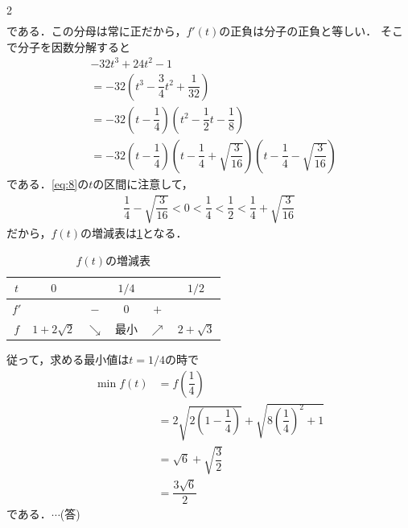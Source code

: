 \documentclass[../../main.tex]{subfiles}
\begin{document}
\begin{multicols}{2}
\begin{align}
  \end{align}
  である．この分母は常に正だから，$f'(t)$の正負は分子の正負と等しい．
  そこで分子を因数分解すると
  \begin{align}
    & -32t^3 + 24t^2-1                                                                                                            \\
    & = -32\left(t^3-\dfrac{3}{4}t^2+\dfrac{1}{32}\right)                                                                           \\
    & = -32\left(t-\dfrac{1}{4}\right)\left(t^2-\dfrac{1}{2}t-\dfrac{1}{8}\right)                                                    \\
    & = -32\left(t-\dfrac{1}{4}\right)\left(t-\dfrac{1}{4}+\sqrt{\dfrac{3}{16}}\right)\left(t-\dfrac{1}{4}-\sqrt{\dfrac{3}{16}}\right)
  \end{align}
  である．\cref{eq:8}の$t$の区間に注意して，
  \begin{align}
    \dfrac{1}{4}-\sqrt{\dfrac{3}{16}} < 0 < \dfrac{1}{4} < \dfrac{1}{2} < \dfrac{1}{4}+\sqrt{\dfrac{3}{16}}
  \end{align}
  だから，$f(t)$の増減表は\cref{2002-2:table:1}となる．

  \begin{table}[H]
    \centering
    \caption{$f(t)$の増減表}
    \label{2002-2:table:1}
    \begin{tabular}{|c||c|c|c|c|c|}
      \hline
      $t$  & $0$           &            & $1/4$ &            & $1/2$        \\
      \hline
      $f'$ &               & $-$        & $0$   & $+$        &              \\
      \hline
      $f$  & $1+2\sqrt{2}$ & $\searrow$ & 最小    & $\nearrow$ & $2+\sqrt{3}$ \\
      \hline
    \end{tabular}
  \end{table}

  従って，求める最小値は$t=1/4$の時で
  \begin{align}
    \min f(t)
    & = f\left(\dfrac{1}{4}\right)                                                  \\
    & = 2\sqrt{2\left(1-\dfrac{1}{4}\right)} + \sqrt{8\left(\dfrac{1}{4}\right)^2+1} \\
    & = \sqrt{6} + \sqrt{\dfrac{3}{2}}                                              \\
    & = \dfrac{3\sqrt{6}}{2}
  \end{align}
  である．$\cdots$(答)


\end{multicols}
\end{document}

